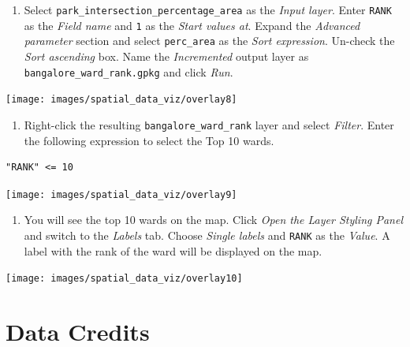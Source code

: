 \documentclass[
  12pt,
  a4paper]{article}
\providecommand{\tightlist}{%
  \setlength{\itemsep}{0pt}\setlength{\parskip}{0pt}}
\begin{document}
\begin{enumerate}
\def\labelenumi{\arabic{enumi}.}
\setcounter{enumi}{7}
\tightlist
\item
  Select \texttt{park\_intersection\_percentage\_area} as the
  \emph{Input layer}. Enter \texttt{RANK} as the \emph{Field name} and
  \texttt{1} as the \emph{Start values at}. Expand the \emph{Advanced
  parameter} section and select \texttt{perc\_area} as the \emph{Sort
  expression}. Un-check the \emph{Sort ascending} box. Name the
  \emph{Incremented} output layer as \texttt{bangalore\_ward\_rank.gpkg}
  and click \emph{Run}.
\end{enumerate}

\begin{center}\texttt{[image: images/spatial\_data\_viz/overlay8]} \end{center}

\begin{enumerate}
\def\labelenumi{\arabic{enumi}.}
\setcounter{enumi}{8}
\tightlist
\item
  Right-click the resulting \texttt{bangalore\_ward\_rank} layer and
  select \emph{Filter}. Enter the following expression to select the Top
  10 wards.
\end{enumerate}

\begin{verbatim}
"RANK" <= 10
\end{verbatim}

\begin{center}\texttt{[image: images/spatial\_data\_viz/overlay9]} \end{center}

\begin{enumerate}
\def\labelenumi{\arabic{enumi}.}
\setcounter{enumi}{9}
\tightlist
\item
  You will see the top 10 wards on the map. Click \emph{Open the Layer
  Styling Panel} and switch to the \emph{Labels} tab. Choose
  \emph{Single labels} and \texttt{RANK} as the \emph{Value}. A label
  with the rank of the ward will be displayed on the map.
\end{enumerate}

\begin{center}\texttt{[image: images/spatial\_data\_viz/overlay10]} \end{center}

\newpage

\hypertarget{data-credits}{%
\section{Data Credits}\label{data-credits}}
\end{document}
